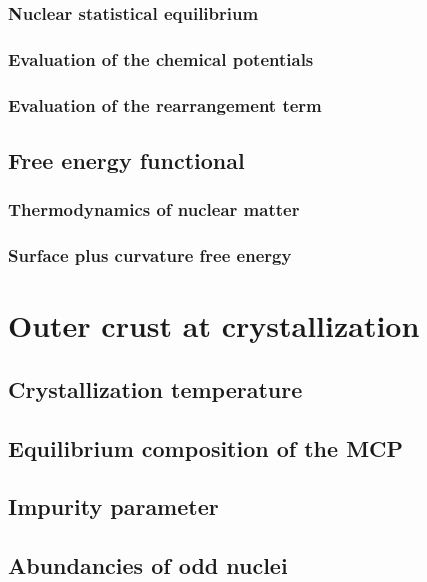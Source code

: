 \subsubsection{Nuclear statistical equilibrium}

\subsubsection{Evaluation of the chemical potentials}

\subsubsection{Evaluation of the rearrangement term}

\subsection{Free energy functional}

\subsubsection{Thermodynamics of nuclear matter}

\subsubsection{Surface plus curvature free energy}

\section{Outer crust at crystallization}

\subsection{Crystallization temperature}

\subsection{Equilibrium composition of the MCP}

\subsection{Impurity parameter}

\subsection{Abundancies of odd nuclei}

